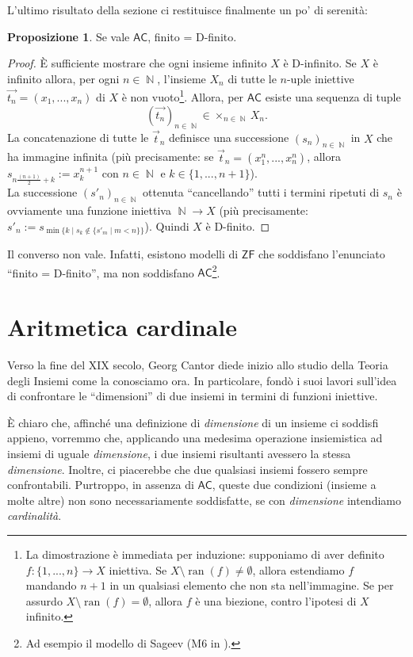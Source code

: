 \documentclass[12pt,a4paper]{report}
\theoremstyle{definition}
\newtheorem{prop}[teo]{Proposizione}  %
\theoremstyle{num.custom-title}
\DeclareMathOperator{\ran}{ran}
\DeclareMathOperator{\N}{\mathbb{N}}
\DeclareMathOperator{\sm}{\setminus}
\newcommand{\AC}{\ensuremath{\mathsf{AC}}\xspace}
\newcommand{\ZF}{\ensuremath{\mathsf{ZF}}\xspace}
\begin{document}
L'ultimo risultato della sezione ci restituisce finalmente un po' di serenità:

\begin{prop} 
Se vale \AC, finito = D-finito.
\begin{proof}
È sufficiente mostrare che ogni insieme infinito $X$ è D-infinito. Se $X$ è infinito allora, per ogni $n \in \N$, l'insieme $X_n$ di tutte le $n$-uple iniettive $\overrightarrow{t_n} = (x_1,...,x_n)$ di $X$ è non vuoto\footnote{La dimostrazione è immediata per induzione: supponiamo di aver definito $f: \{1,...,n\} \to X$ iniettiva. Se $X \sm \ran(f) \neq \emptyset$, allora estendiamo $f$ mandando $n+1$ in un qualsiasi elemento che non sta nell'immagine. Se per assurdo $X \sm \ran(f) = \emptyset$, allora $f$ è una biezione, contro l'ipotesi di $X$ infinito.}. Allora, per \AC esiste una sequenza di tuple 
\[
\left(\overrightarrow{t_n}\right)_{n \in \N} \in \times_{n \in \N} X_n.
\]
La concatenazione di tutte le $\overrightarrow{t}_n$ definisce una successione $(s_n)_{n \in \N}$ in $X$ che ha immagine infinita (più precisamente: se $\overrightarrow{t}_n=(x_1^n,...,x_n^n)$, allora $s_{n \frac{(n+1)}{2}+k} := x_k^{n+1}$ con $n \in \N$ e $k \in \{1,...,n+1\}$).\\
La successione $(s'_n)_{n \in \N}$ ottenuta ``cancellando'' tutti i termini ripetuti di $s_n$ è ovviamente una funzione iniettiva $\N \to X$ (più precisamente: $s'_n := s_{\min\{k \mid s_k \not\in \{s'_m \mid m<n\}\}}$). Quindi $X$ è D-finito.
\end{proof}
\end{prop}

Il converso non vale. Infatti, esistono modelli di \ZF che soddisfano l'enunciato ``finito = D-finito'', ma non soddisfano \AC\footnote{Ad esempio il modello di Sageev (M6 in \cite{HoRu98:Herrlich}).}.

\section{Aritmetica cardinale}

Verso la fine del XIX secolo, Georg Cantor diede inizio allo studio della Teoria degli Insiemi come la conosciamo ora. In particolare, fondò i suoi lavori sull'idea di confrontare le ``dimensioni'' di due insiemi in termini di funzioni iniettive.

È chiaro che, affinché una definizione di \emph{dimensione} di un insieme ci soddisfi appieno, vorremmo che, applicando una medesima operazione insiemistica ad insiemi di uguale \emph{dimensione}, i due insiemi risultanti avessero la stessa \emph{dimensione}. Inoltre, ci piacerebbe che due qualsiasi insiemi fossero sempre confrontabili. Purtroppo, in assenza di \AC, queste due condizioni (insieme a molte altre) non sono necessariamente soddisfatte, se con \emph{dimensione} intendiamo \emph{cardinalità}.\
\end{document}
